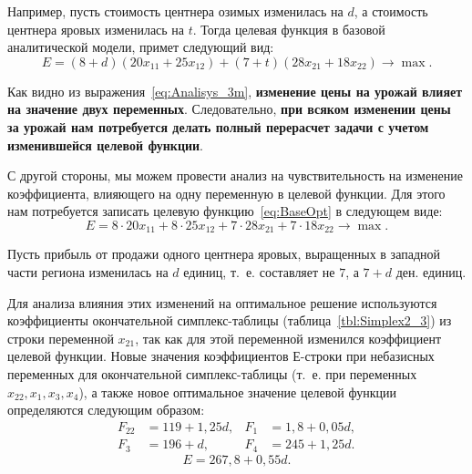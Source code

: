 Например, пусть стоимость центнера озимых изменилась на $ d $, а стоимость центнера 
яровых изменилась на $ t $. Тогда целевая функция в базовой аналитической модели,
примет следующий вид:
\begin{equation}
\label{eq:Analisys_3m}
  E = (8 + d)(20x_{11} + 25x_{12}) + (7 + t)(28x_{21} + 18x_{22}) \rightarrow \max.
\end{equation} 

Как видно из выражения~\eqref{eq:Analisys_3m}, \textbf{изменение цены на
  урожай влияет на значение двух переменных}. Следовательно, \textbf{при
  всяком изменении цены за урожай нам потребуется делать полный
  перерасчет задачи с учетом изменившейся целевой функции}.

С другой стороны, мы можем провести анализ на чувствительность на изменение коэффициента, влияющего
на одну переменную в целевой функции. Для этого нам потребуется записать целевую
функцию~\eqref{eq:BaseOpt} в следующем виде:
\begin{equation}
\label{eq:Analisys_3m_2}
  E = 8 \cdot 20x_{11} + 8 \cdot 25x_{12} + 7 \cdot 28x_{21} + 7 \cdot 18x_{22} \rightarrow \max.
\end{equation} 

Пусть прибыль от продажи одного центнера яровых, выращенных в западной части региона изменилась на $ d $ единиц,
т.~е. составляет не $ 7 $, а $ 7 + d $ ден. единиц.

Для анализа влияния этих изменений на оптимальное решение используются коэффициенты
окончательной симплекс-таблицы (таблица~\ref{tbl:Simplex2_3}) из строки переменной $ x_{21} $, 
так как для этой переменной изменился коэффициент целевой функции.
Новые значения коэффициентов $ Е $-строки при небазисных переменных для окончательной симплекс-таблицы
(т.~е. при переменных $ x_{22}, x_{1}, x_{3}, x_{4} $),
а также новое оптимальное значение целевой функции определяются следующим образом: 
\begin{equation}
  \label{eq:Analisys_3m_3}
  \begin{aligned}
    F_{22} &= 119 + 1{,}25d, &
    F_{1} &= 1{,}8 + 0{,}05d, \\
    F_{3} &= 196 + d, &
    F_{4} &= 245 + 1{,}25d.
  \end{aligned}
\end{equation}
\begin{equation}
      E = 267{,}8 + 0{,}55d.
\end{equation}

